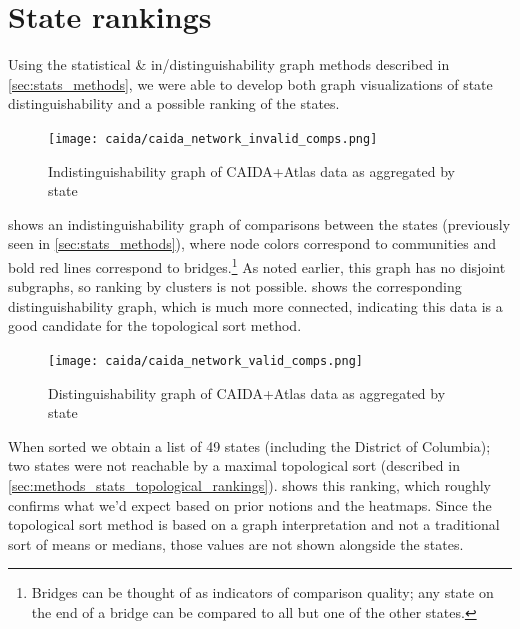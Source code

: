 \section{State rankings}

Using the statistical \& in/distinguishability graph methods described in \cref{sec:stats_methods}, we were able to develop both graph visualizations of state distinguishability and a possible ranking of the states.

\begin{figure}[h]
    \centering
    \texttt{[image: caida/caida\_network\_invalid\_comps.png]}
    \caption{Indistinguishability graph of CAIDA+Atlas data as aggregated by state}
    \label{fig:caida_network_invalid_comps}
\end{figure}

 shows an indistinguishability graph of comparisons between the states (previously seen in \cref{sec:stats_methods}), where node colors correspond to communities and bold red lines correspond to bridges.\footnote{Bridges can be thought of as indicators of comparison quality; any state on the end of a bridge can be compared to all but one of the other states.} As noted earlier, this graph has no disjoint subgraphs, so ranking by clusters is not possible.  shows the corresponding distinguishability graph, which is much more connected, indicating this data is a good candidate for the topological sort method.

\suppressfloats %
\begin{figure}[h]
    \centering
    \texttt{[image: caida/caida\_network\_valid\_comps.png]}
    \caption{Distinguishability graph of CAIDA+Atlas data as aggregated by state}
    \label{fig:caida_network_valid_comps}
\end{figure}

When sorted we obtain a list of 49 states (including the District of Columbia); two states were not reachable by a maximal topological sort (described in \cref{sec:methods_stats_topological_rankings}).  shows this ranking, which roughly confirms what we'd expect based on prior notions and the heatmaps. Since the topological sort method is based on a graph interpretation and not a traditional sort of means or medians, those values are not shown alongside the states.

\suppressfloats %


